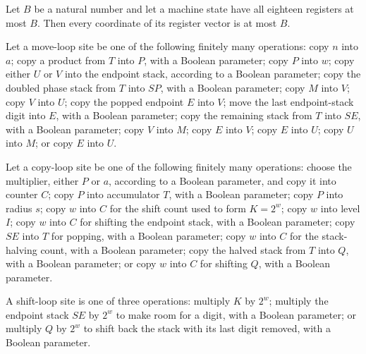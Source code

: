 \begin{lemma}
\label{Complexity.LogProg.SavitchARM.St.Bd.toV}
\leanok
{}
Let $B$ be a natural number and let a machine state have all eighteen registers at most
$B$. Then every coordinate of its register vector is at most $B$.
\end{lemma}

\begin{definition}
\label{Complexity.LogProg.SavitchARM.MvS}
\leanok
Let a move-loop site be one of the following finitely many operations: copy $n$ into
$a$; copy a product from $T$ into $P$, with a Boolean parameter; copy $P$ into $w$; copy
either $U$ or $V$ into the endpoint stack, according to a Boolean parameter; copy the
doubled phase stack from $T$ into $SP$, with a Boolean parameter; copy $M$ into $V$;
copy $V$ into $U$; copy the popped endpoint $E$ into $V$; move the last endpoint-stack
digit into $E$, with a Boolean parameter; copy the remaining stack from $T$ into $SE$,
with a Boolean parameter; copy $V$ into $M$; copy $E$ into $V$; copy $E$ into $U$; copy
$U$ into $M$; or copy $E$ into $U$.
\end{definition}

\begin{definition}
\label{Complexity.LogProg.SavitchARM.CpS}
\leanok
Let a copy-loop site be one of the following finitely many operations: choose the
multiplier, either $P$ or $a$, according to a Boolean parameter, and copy it into
counter $C$; copy $P$ into accumulator $T$, with a Boolean parameter; copy $P$ into
radius $s$; copy $w$ into $C$ for the shift count used to form $K=2^w$; copy $w$ into
level $I$; copy $w$ into $C$ for shifting the endpoint stack, with a Boolean parameter;
copy $SE$ into $T$ for popping, with a Boolean parameter; copy $w$ into $C$ for the
stack-halving count, with a Boolean parameter; copy the halved stack from $T$ into $Q$,
with a Boolean parameter; or copy $w$ into $C$ for shifting $Q$, with a Boolean
parameter.
\end{definition}

\begin{definition}
\label{Complexity.LogProg.SavitchARM.ShS}
\leanok
A shift-loop site is one of three operations: multiply $K$ by $2^w$; multiply the
endpoint stack $SE$ by $2^w$ to make room for a digit, with a Boolean parameter; or
multiply $Q$ by $2^w$ to shift back the stack with its last digit removed, with a
Boolean parameter.
\end{definition}

